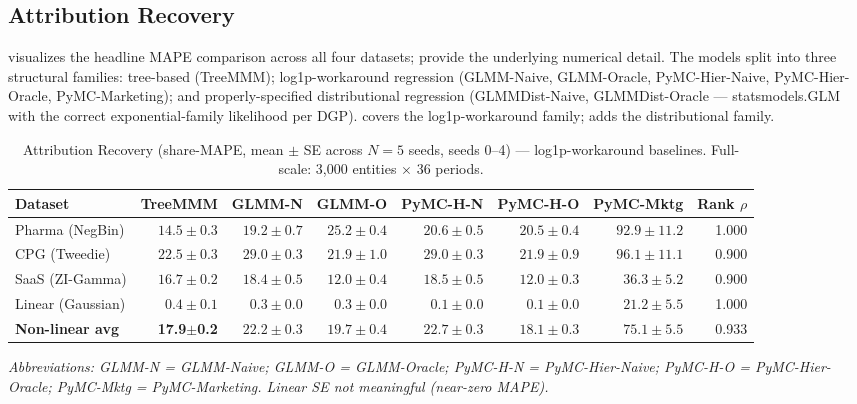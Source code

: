 \documentclass[review,12pt]{elsarticle}
\begin{document}
\subsection{Attribution Recovery}
\label{sec:results:attribution}

 visualizes the headline MAPE comparison across all
four datasets;  provide the underlying numerical
detail. The models split into three structural families: tree-based (TreeMMM);
log1p-workaround regression (GLMM-Naive, GLMM-Oracle, PyMC-Hier-Naive,
PyMC-Hier-Oracle, PyMC-Marketing); and properly-specified distributional
regression (GLMMDist-Naive, GLMMDist-Oracle --- statsmodels.GLM with the
correct exponential-family likelihood per DGP).  covers the
log1p-workaround family;  adds the distributional family.

\begin{table}
\centering
\small
\caption{Attribution Recovery (share-MAPE, mean $\pm$ SE across $N{=}5$ seeds,
         seeds 0--4) --- log1p-workaround baselines.
         Full-scale: 3,000 entities $\times$ 36 periods.}
\label{tab:attr2a}
\begin{tabular}{@{}lrrrrrrr@{}}
\toprule
Dataset & TreeMMM & GLMM-N & GLMM-O & PyMC-H-N & PyMC-H-O & PyMC-Mktg & Rank $\rho$ \\
\midrule
Pharma (NegBin)  & $14.5\pm0.3$ & $19.2\pm0.7$ & $25.2\pm0.4$ & $20.6\pm0.5$ & $20.5\pm0.4$ & $92.9\pm11.2$ & 1.000 \\
CPG (Tweedie)    & $22.5\pm0.3$ & $29.0\pm0.3$ & $21.9\pm1.0$ & $29.0\pm0.3$ & $21.9\pm0.9$ & $96.1\pm11.1$ & 0.900 \\
SaaS (ZI-Gamma)  & $16.7\pm0.2$ & $18.4\pm0.5$ & $12.0\pm0.4$ & $18.5\pm0.5$ & $12.0\pm0.3$ & $36.3\pm5.2$  & 0.900 \\
Linear (Gaussian)& $0.4\pm0.1$  & $0.3\pm0.0$  & $0.3\pm0.0$  & $0.1\pm0.0$  & $0.1\pm0.0$  & $21.2\pm5.5$  & 1.000 \\
\midrule
\textbf{Non-linear avg} & \textbf{17.9$\pm$0.2} & $22.2\pm0.3$ & $19.7\pm0.4$ & $22.7\pm0.3$ & $18.1\pm0.3$ & $75.1\pm5.5$ & 0.933 \\
\bottomrule
\end{tabular}
\medskip
\small\textit{Abbreviations: GLMM-N = GLMM-Naive; GLMM-O = GLMM-Oracle;
PyMC-H-N = PyMC-Hier-Naive; PyMC-H-O = PyMC-Hier-Oracle;
PyMC-Mktg = PyMC-Marketing. Linear SE not meaningful (near-zero MAPE).}
\end{table}
\end{document}
